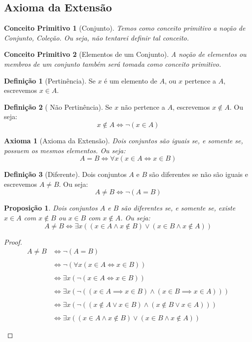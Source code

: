 \documentclass{article}
\newtheorem{axioma}{Axioma}
\newtheorem{conceitoPrimitivo}{Conceito Primitivo}
\newtheorem{prop}{Proposição}[section]
\theoremstyle{theorem}
\theoremstyle{lemma}
\theoremstyle{definition}
\newtheorem{definicao}{Definição}[section]
\theoremstyle{remark}
\begin{document}
\subsection{Axioma da Extensão}
\begin{conceitoPrimitivo}[Conjunto]
	Temos como conceito primitivo a noção de Conjunto, Coleção. Ou seja, não tentarei definir tal conceito.
\end{conceitoPrimitivo}
\begin{conceitoPrimitivo}[Elementos de um Conjunto]
	A noção de elementos ou membros de um conjunto também será tomada como conceito primitivo.
\end{conceitoPrimitivo}
\begin{definicao}[Pertinência]
	Se $x$ é um elemento de $A$, ou $x$ pertence a $A$, escrevemos $x\in A$.
\end{definicao}
\begin{definicao}[ Não Pertinência]
	Se $x$ não pertence a $A$, escrevemos $x \not \in A$. Ou seja:
	$$x \not \in A \iff \neg (x\in A)$$
\end{definicao}
\begin{axioma}[Axioma da Extensão]
	Dois conjuntos são iguais se, e somente se, possuem os mesmos elementos. Ou seja: 
	$$ A = B \iff \forall x ( x\in A \iff x \in B) $$
\end{axioma}
\begin{definicao}[Diferente]
	Dois conjuntos $A$ e $B$ são diferentes se não são iguais e escrevemos $A\neq B$. Ou seja:
	$$A\neq B \iff \neg (A = B)$$
\end{definicao}
\begin{prop}
	Dois conjuntos $A$ e $B$  são diferentes se, e somente se, existe $x\in A$ com $x\not \in B $ ou $x\in B$ com $x\not \in A$. Ou seja:
	$$A \neq B \iff \exists x ( ( x\in A \land x\not \in B) \lor (x\in B  \land x\not \in A))$$
\end{prop}
\begin{proof}
	\begin{align*}
		A\neq B &\iff \neg (A = B) \\~\\
		&\iff \neg (\forall x ( x\in A \iff x \in B)) \\~\\
		&\iff \exists x ( \neg ( x\in A \iff x \in B)) \\~\\
		&\iff \exists x ( \neg (( x\in A \implies x \in B) \land (x\in B \implies x\in A))) \\~\\
		&\iff \exists x ( \neg ((  x\not\in A \lor x\in B) \land ( x\not\in B \lor x\in A))) \\~\\
		&\iff \exists x ( (  x\in A \land x\not\in B) \lor ( x\in B \land x\not \in A)) \\~\\
	\end{align*}
\end{proof}
\end{document}
